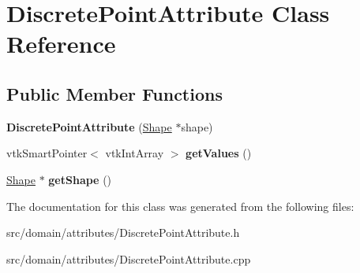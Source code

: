 \hypertarget{class_discrete_point_attribute}{}\section{Discrete\+Point\+Attribute Class Reference}
\label{class_discrete_point_attribute}
\subsection*{Public Member Functions}
\begin{DoxyCompactItemize}
\item 
\hypertarget{class_discrete_point_attribute_ae621f748d818a634a3048cb4a91722fa}{}{\bfseries Discrete\+Point\+Attribute} (\hyperlink{class_shape}{Shape} $\ast$shape)\label{class_discrete_point_attribute_ae621f748d818a634a3048cb4a91722fa}

\item 
\hypertarget{class_discrete_point_attribute_a0516593a4f91658c1cbee796c700ca2e}{}vtk\+Smart\+Pointer$<$ vtk\+Int\+Array $>$ {\bfseries get\+Values} ()\label{class_discrete_point_attribute_a0516593a4f91658c1cbee796c700ca2e}

\item 
\hypertarget{class_discrete_point_attribute_a5b75b8aa4b8c0ad8b6b1752b15451337}{}\hyperlink{class_shape}{Shape} $\ast$ {\bfseries get\+Shape} ()\label{class_discrete_point_attribute_a5b75b8aa4b8c0ad8b6b1752b15451337}

\end{DoxyCompactItemize}


The documentation for this class was generated from the following files\+:\begin{DoxyCompactItemize}
\item 
src/domain/attributes/Discrete\+Point\+Attribute.\+h\item 
src/domain/attributes/Discrete\+Point\+Attribute.\+cpp\end{DoxyCompactItemize}
